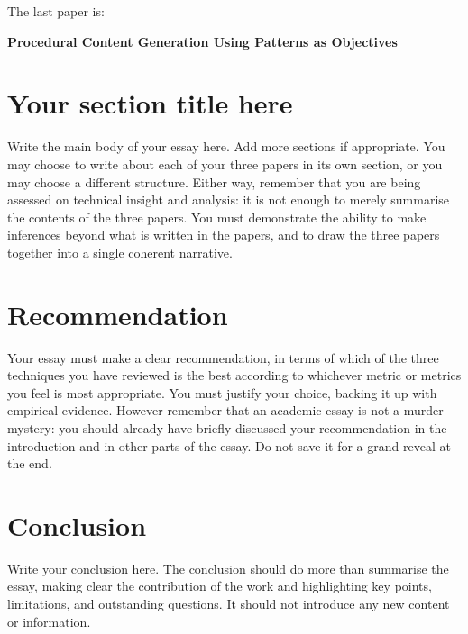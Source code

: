 \documentclass{scrartcl}
\begin{document}
The last paper is:

\textbf{Procedural Content Generation Using Patterns as Objectives}\cite{dahlskog2014}









\section{Your section title here}

Write the main body of your essay here. Add more sections if appropriate. You may choose to write about each of your three papers in its own section, or you may choose a different structure. Either way, remember that you are being assessed on technical insight and analysis: it is not enough to merely summarise the contents of the three papers. You must demonstrate the ability to make inferences beyond what is written in the papers, and to draw the three papers together into a single coherent narrative.

\section{Recommendation}

Your essay must make a clear recommendation, in terms of which of the three techniques you have reviewed is the best according to whichever metric or metrics you feel is most appropriate. You must justify your choice, backing it up with empirical evidence. However remember that an academic essay is not a murder mystery: you should already have briefly discussed your recommendation in the introduction and in other parts of the essay. Do not save it for a grand reveal at the end.

\section{Conclusion}

Write your conclusion here. The conclusion should do more than summarise the essay, making clear the contribution of the work and highlighting key points, limitations, and outstanding questions. It should not introduce any new content or information.



\end{document}
